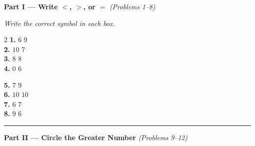 \documentclass[12pt, letterpaper]{article}
\newcommand{\symbox}{\fbox{\hspace{0.7cm}}}  %
\begin{document}
\noindent\textcolor{scholared}{\large\textbf{Part I — Write $<$, $>$, or $=$}} \hfill \textit{(Problems 1–8)}

\medskip
\noindent\textit{Write the correct symbol in each box.}

\bigskip

\begin{multicols}{2}
\noindent\textbf{1.} \quad $6$ \quad \symbox \quad $9$ \\[18pt]
\noindent\textbf{2.} \quad $10$ \quad \symbox \quad $7$ \\[18pt]
\noindent\textbf{3.} \quad $8$ \quad \symbox \quad $8$ \\[18pt]
\noindent\textbf{4.} \quad $0$ \quad \symbox \quad $6$

\columnbreak

\noindent\textbf{5.} \quad $7$ \quad \symbox \quad $9$ \\[18pt]
\noindent\textbf{6.} \quad $10$ \quad \symbox \quad $10$ \\[18pt]
\noindent\textbf{7.} \quad $6$ \quad \symbox \quad $7$ \\[18pt]
\noindent\textbf{8.} \quad $9$ \quad \symbox \quad $6$
\end{multicols}

\bigskip
\noindent\textcolor{scholared}{\rule{\linewidth}{0.4pt}}

\noindent\textcolor{scholared}{\large\textbf{Part II — Circle the Greater Number}} \hfill \textit{(Problems 9–12)}
\end{document}
